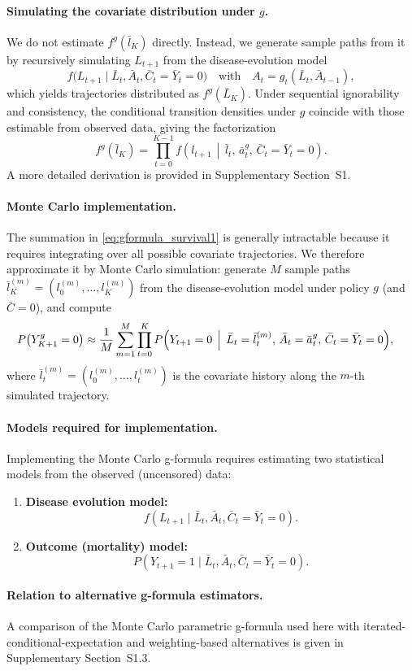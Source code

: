 \paragraph{Simulating the covariate distribution under $g$.}
We do not estimate $f^g(\bar l_K)$ directly. Instead, we generate sample paths from it
by recursively simulating $L_{t+1}$ from the disease-evolution model
\[
f\bigl(L_{t+1}\mid \bar L_t,\bar A_t,\bar C_t=\bar Y_t=0\bigr)
\quad \text{with} \quad A_t = g_t(\bar L_t,\bar A_{t-1}),
\]
which yields trajectories distributed as $f^g(\bar L_K)$.
Under sequential ignorability and consistency, the conditional transition densities
under $g$ coincide with those estimable from observed data, giving the factorization
\[
f^g(\bar l_K)
=
\prod_{t=0}^{K-1}
f\!\left(
l_{t+1}
\,\middle|\,
\bar l_t,\,
\bar a_t^g,\,
\bar C_t=\bar Y_t=0
\right).
\]
A more detailed derivation is provided in Supplementary Section~S1.

\paragraph{Monte Carlo implementation.}
The summation in \eqref{eq:gformula_survival1} is generally intractable because it
requires integrating over all possible covariate trajectories. We therefore approximate
it by Monte Carlo simulation: generate $M$ sample paths
$\bar l_K^{(m)}=(l_0^{(m)},\ldots,l_K^{(m)})$ from the disease-evolution model under
policy $g$ (and $\bar C=0$), and compute
\begin{align}
P\bigl(Y^g_{K+1}=0\bigr)
&\approx
\frac{1}{M}\sum_{m=1}^{M}
\prod_{t=0}^{K}
P\Bigl(
Y_{t+1}=0
\,\Bigm|\,
\bar L_t=\bar l_t^{(m)},\,
\bar A_t=\bar a_t^g,\,
\bar C_t=\bar Y_t=0
\Bigr),
\end{align}
where $\bar l_t^{(m)}=(l_0^{(m)},\ldots,l_t^{(m)})$ is the covariate history along the
$m$-th simulated trajectory.

\paragraph{Models required for implementation.}
Implementing the Monte Carlo g-formula requires estimating two statistical models from
the observed (uncensored) data:
\begin{enumerate}
\item \textbf{Disease evolution model:}
\[
f\!\left(L_{t+1}\mid \bar L_t,\bar A_t,\bar C_t=\bar Y_t=0\right).
\]
\item \textbf{Outcome (mortality) model:}
\[
P\!\left(Y_{t+1}=1\mid \bar L_t,\bar A_t,\bar C_t=\bar Y_t=0\right).
\]
\end{enumerate}

\paragraph{Relation to alternative g-formula estimators.}
A comparison of the Monte Carlo parametric g-formula used here with iterated-conditional-expectation
and weighting-based alternatives is given in Supplementary Section~S1.3.
